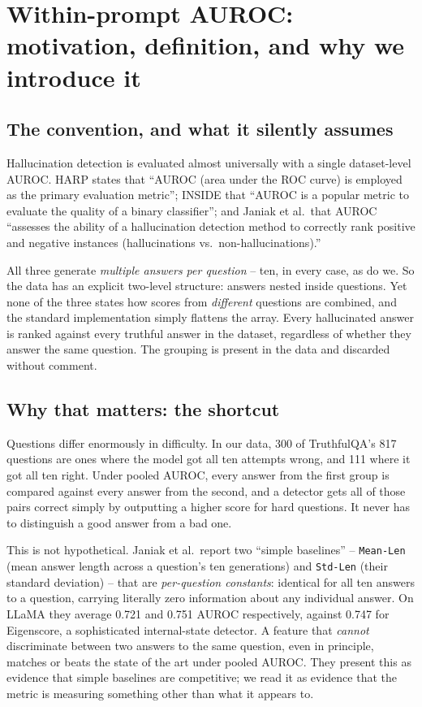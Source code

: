 \documentclass[11pt,a4paper]{article}
\begin{document}
\clearpage
\section*{Within-prompt AUROC: motivation, definition, and why we introduce it}

\subsection*{The convention, and what it silently assumes}

Hallucination detection is evaluated almost universally with a single dataset-level AUROC. HARP
states that ``AUROC (area under the ROC curve) is employed as the primary evaluation metric'';
INSIDE that ``AUROC is a popular metric to evaluate the quality of a binary classifier''; and
Janiak et al.\ that AUROC ``assesses the ability of a hallucination detection method to correctly
rank positive and negative instances (hallucinations vs.\ non-hallucinations).''

All three generate \emph{multiple answers per question} -- ten, in every case, as do we. So the
data has an explicit two-level structure: answers nested inside questions. Yet none of the three
states how scores from \emph{different} questions are combined, and the standard implementation
simply flattens the array. Every hallucinated answer is ranked against every truthful answer in
the dataset, regardless of whether they answer the same question. The grouping is present in the
data and discarded without comment.

\subsection*{Why that matters: the shortcut}

Questions differ enormously in difficulty. In our data, 300 of TruthfulQA's 817 questions are
ones where the model got all ten attempts wrong, and 111 where it got all ten right. Under pooled
AUROC, every answer from the first group is compared against every answer from the second, and a
detector gets all of those pairs correct simply by outputting a higher score for hard questions.
It never has to distinguish a good answer from a bad one.

This is not hypothetical. Janiak et al.\ report two ``simple baselines'' -- \texttt{Mean-Len}
(mean answer length across a question's ten generations) and \texttt{Std-Len} (their standard
deviation) -- that are \emph{per-question constants}: identical for all ten answers to a question,
carrying literally zero information about any individual answer. On LLaMA they average 0.721 and
0.751 AUROC respectively, against 0.747 for Eigenscore, a sophisticated internal-state detector.
A feature that \emph{cannot} discriminate between two answers to the same question, even in
principle, matches or beats the state of the art under pooled AUROC. They present this as evidence
that simple baselines are competitive; we read it as evidence that the metric is measuring
something other than what it appears to.
\end{document}
